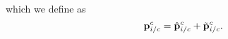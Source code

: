 which we define as
\begin{equation*}
  \boldsymbol{\mathrm{p}}_{i/c}^c = \hat{\boldsymbol{\mathrm{p}}}_{i/c}^c + \tilde{\boldsymbol{\mathrm{p}}}_{i/c}^c .
\end{equation*}




